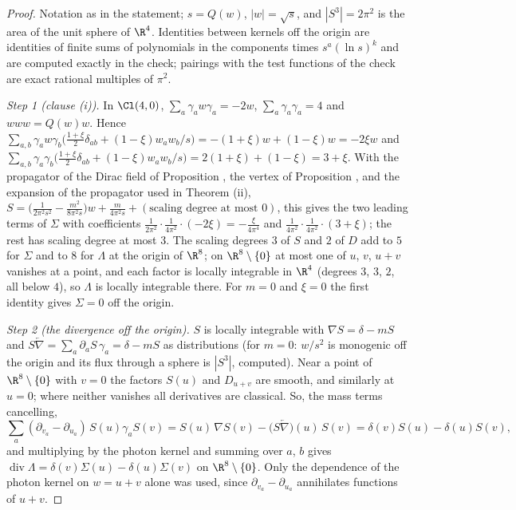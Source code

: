 \begin{proof}
Notation as in the statement; $s = Q(w)$, $|w| = \sqrt{s}$, and $|S^{3}| = 2\pi^{2}$ is the area of the unit sphere of $\R^{4}$. Identities between kernels off the origin are identities of finite sums of polynomials in the components times $s^{a}(\ln s)^{k}$ and are computed exactly in the check; pairings with the test functions of the check are exact rational multiples of $\pi^{2}$.

\emph{Step 1 (clause (i)).} In $\Cl(4,0)$, $\sum_{a}\gamma_{a}w\gamma_{a} = -2w$, $\sum_{a}\gamma_{a}\gamma_{a} = 4$ and $www = Q(w)w$. Hence $\sum_{a,b}\gamma_{a}w\gamma_{b}\big(\tfrac{1+\xi}{2}\delta_{ab} + (1-\xi)w_{a}w_{b}/s\big) = -(1+\xi)w + (1-\xi)w = -2\xi w$ and $\sum_{a,b}\gamma_{a}\gamma_{b}\big(\tfrac{1+\xi}{2}\delta_{ab} + (1-\xi)w_{a}w_{b}/s\big) = 2(1+\xi) + (1-\xi) = 3+\xi$. With the propagator of the Dirac field of Proposition , the vertex of Proposition , and the expansion of the propagator used in Theorem (ii), $S = \big(\frac{1}{2\pi^{2}s^{2}} - \frac{m^{2}}{8\pi^{2}s}\big)w + \frac{m}{4\pi^{2}s} + (\text{scaling degree at most } 0)$, this gives the two leading terms of $\Sigma$ with coefficients $\frac{1}{2\pi^{2}}\cdot\frac{1}{4\pi^{2}}\cdot(-2\xi) = -\frac{\xi}{4\pi^{4}}$ and $\frac{1}{4\pi^{2}}\cdot\frac{1}{4\pi^{2}}\cdot(3+\xi)$; the rest has scaling degree at most $3$. The scaling degrees $3$ of $S$ and $2$ of $D$ add to $5$ for $\Sigma$ and to $8$ for $\Lambda$ at the origin of $\R^{8}$; on $\R^{8}\setminus\{0\}$ at most one of $u$, $v$, $u+v$ vanishes at a point, and each factor is locally integrable in $\R^{4}$ (degrees $3$, $3$, $2$, all below $4$), so $\Lambda$ is locally integrable there. For $m = 0$ and $\xi = 0$ the first identity gives $\Sigma = 0$ off the origin.

\emph{Step 2 (the divergence off the origin).} $S$ is locally integrable with $\nabla S = \delta - mS$ and $S\overleftarrow{\nabla} = \sum_{a}\partial_{a}S\,\gamma_{a} = \delta - mS$ as distributions (for $m = 0$: $w/s^{2}$ is monogenic off the origin and its flux through a sphere is $|S^{3}|$, computed). Near a point of $\R^{8}\setminus\{0\}$ with $v = 0$ the factors $S(u)$ and $D_{u+v}$ are smooth, and similarly at $u = 0$; where neither vanishes all derivatives are classical. So, the mass terms cancelling,
\[
\sum_{a}(\partial_{v_{a}} - \partial_{u_{a}})\,S(u)\gamma_{a}S(v) = S(u)\,\nabla S(v) - \big(S\overleftarrow{\nabla}\big)(u)\,S(v) = \delta(v)S(u) - \delta(u)S(v),
\]
and multiplying by the photon kernel and summing over $a$, $b$ gives $\operatorname{div}\Lambda = \delta(v)\Sigma(u) - \delta(u)\Sigma(v)$ on $\R^{8}\setminus\{0\}$. Only the dependence of the photon kernel on $w = u + v$ alone was used, since $\partial_{v_{a}} - \partial_{u_{a}}$ annihilates functions of $u + v$.


\end{proof}
